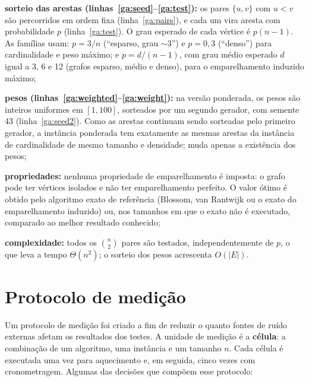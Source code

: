\begin{alineas}
    \item \textbf{sorteio das arestas (linhas~\ref{ga:seed}--\ref{ga:test}):} os pares $\{u, v\}$ com $u < v$ são percorridos em ordem fixa (linha~\ref{ga:pairs}), e cada um vira aresta com probabilidade $p$ (linha~\ref{ga:test}). O grau esperado de cada vértice é $p(n-1)$. As famílias usam: $p = 3/n$ (``esparso, grau $\sim$3'') e $p = 0{,}3$ (``denso'') para cardinalidade e peso máximo; e $p = d/(n-1)$, com grau médio esperado $d$ igual a 3, 6 e 12 (grafos esparso, médio e denso), para o emparelhamento induzido máximo;
    \item \textbf{pesos (linhas~\ref{ga:weighted}--\ref{ga:weight}):} na versão ponderada, os pesos são inteiros uniformes em $[1, 100]$, sorteados por um segundo gerador, com semente 43 (linha~\ref{ga:seed2}). Como as arestas continuam sendo sorteadas pelo primeiro gerador, a instância ponderada tem exatamente as mesmas arestas da instância de cardinalidade de mesmo tamanho e densidade; muda apenas a existência dos pesos;
    \item \textbf{propriedades:} nenhuma propriedade de emparelhamento é imposta: o grafo pode ter vértices isolados e não ter emparelhamento perfeito. O valor ótimo é obtido pelo algoritmo exato de referência (Blossom, van Rantwijk ou o exato do emparelhamento induzido) ou, nos tamanhos em que o exato não é executado, comparado ao melhor resultado conhecido;
    \item \textbf{complexidade:} todos os $\binom{n}{2}$ pares são testados, independentemente de $p$, o que leva a tempo $\Theta(n^2)$; o sorteio dos pesos acrescenta $O(|E|)$.
\end{alineas}

\section{Protocolo de medição}
\label{sec:protocolo}

Um protocolo de medição foi criado a fim de reduzir o quanto fontes de ruído externas afetam os resultados dos testes. A unidade de medição é a \textbf{célula}: a combinação de um algoritmo, uma instância e um tamanho $n$. Cada célula é executada uma vez para aquecimento e, em seguida, cinco vezes com cronometragem. Algumas das decisões que compõem esse protocolo:

